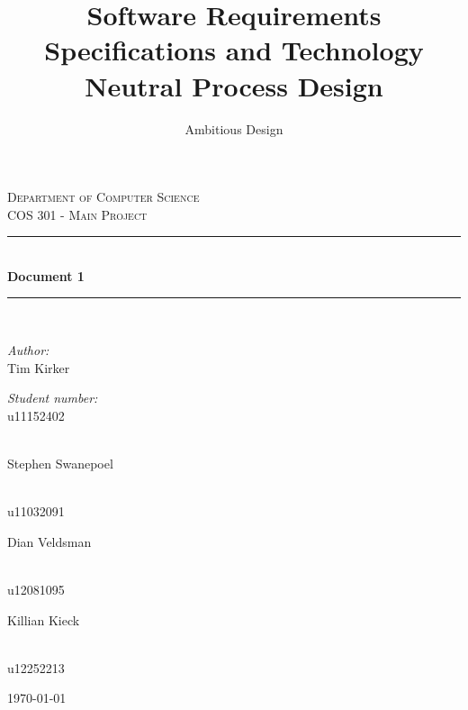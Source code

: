 \documentclass[a4paper,12pt]{report}
\author{Ambitious Design}
\title{ Software Requirements Specifications and Technology Neutral Process Design}
\newcommand{\HRule}{\rule{\linewidth}{0.5mm}}
\begin{document}
\setlength{\parskip}{6pt}

\begin{titlepage}

\begin{center}
\textsc{\LARGE Department of Computer Science}\\[1.5cm]
\textsc{\Large COS 301 - Main Project}\\[0.5cm]
\HRule \\[0.4cm]
{ \huge \bfseries Document 1}\\[0.4cm]
\HRule \\[0.4cm]
\begin{minipage}{0.4\textwidth}
\begin{flushleft} \large
\emph{Author:}\\
Tim {Kirker}
\end{flushleft}
\end{minipage}
\begin{minipage}{0.4\textwidth}
\begin{flushright} \large
\emph{Student number:} \\
u11152402
\end{flushright}
\end{minipage}
\begin{minipage}{0.4\textwidth}
\begin{flushleft} \large
\emph{} \\
Stephen {Swanepoel}
\end{flushleft}
\end{minipage}
\begin{minipage}{0.4\textwidth}
\begin{flushright} \large
\emph{} \\
u11032091
\end{flushright}
\end{minipage}
\begin{minipage}{0.4\textwidth}
\begin{flushleft} \large
Dian {Veldsman}
\end{flushleft}
\end{minipage}
\begin{minipage}{0.4\textwidth}
\begin{flushright} \large
\emph{} \\
u12081095
\end{flushright}
\end{minipage}
\begin{minipage}{0.4\textwidth}
\begin{flushleft} \large
Killian {Kieck}
\end{flushleft}
\end{minipage}
\begin{minipage}{0.4\textwidth}
\begin{flushright} \large
\emph{} \\
u12252213
\end{flushright}
\end{minipage}


{\large \today}
\end{center}
\end{titlepage}
\footnotesize
\normalsize
\end{document}
